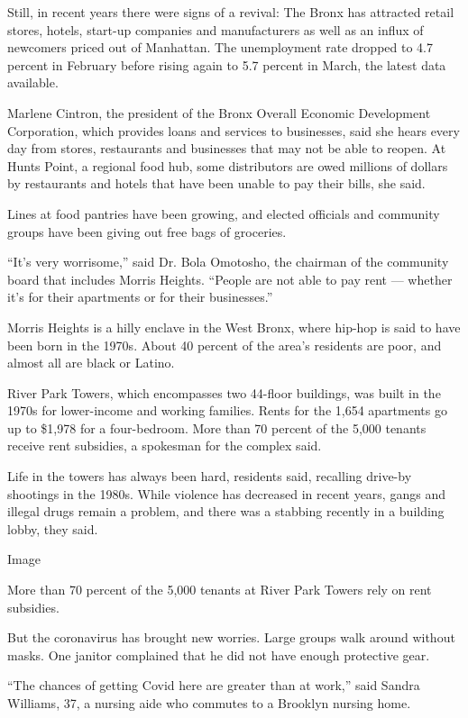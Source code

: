 Still, in recent years there were signs of a revival: The Bronx has
attracted retail stores, hotels, start-up companies and manufacturers as
well as an influx of newcomers priced out of Manhattan. The unemployment
rate dropped to 4.7 percent in February before rising again to 5.7
percent in March, the latest data available.

Marlene Cintron, the president of the Bronx Overall Economic Development
Corporation, which provides loans and services to businesses, said she
hears every day from stores, restaurants and businesses that may not be
able to reopen. At Hunts Point, a regional food hub, some distributors
are owed millions of dollars by restaurants and hotels that have been
unable to pay their bills, she said.

Lines at food pantries have been growing, and elected officials and
community groups have been giving out free bags of groceries.

``It's very worrisome,'' said Dr. Bola Omotosho, the chairman of the
community board that includes Morris Heights. ``People are not able to
pay rent --- whether it's for their apartments or for their
businesses.''

Morris Heights is a hilly enclave in the West Bronx, where hip-hop is
said to have been born in the 1970s. About 40 percent of the area's
residents are poor, and almost all are black or Latino.

River Park Towers, which encompasses two 44-floor buildings, was built
in the 1970s for lower-income and working families. Rents for the 1,654
apartments go up to \$1,978 for a four-bedroom. More than 70 percent of
the 5,000 tenants receive rent subsidies, a spokesman for the complex
said.

Life in the towers has always been hard, residents said, recalling
drive-by shootings in the 1980s. While violence has decreased in recent
years, gangs and illegal drugs remain a problem, and there was a
stabbing recently in a building lobby, they said.

Image

More than 70 percent of the 5,000 tenants at River Park Towers rely on
rent subsidies.~

But the coronavirus has brought new worries. Large groups walk around
without masks. One janitor complained that he did not have enough
protective gear.

``The chances of getting Covid here are greater than at work,'' said
Sandra Williams, 37, a nursing aide who commutes to a Brooklyn nursing
home.

